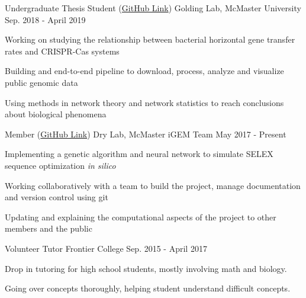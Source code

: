 \begin{cventries}
    \cventry
      {Undergraduate Thesis Student (\href{https://github.com/DJSiddharthVader/thesis_SidReed}{GitHub Link})}
      {Golding Lab, McMaster University}
      {Sep. 2018 - April 2019}
      {}
      {
        \begin{cvitems}
         \item {Working on studying the relationship between bacterial horizontal gene transfer rates and CRISPR-Cas systems}
         \item {Building and end-to-end pipeline to download, process, analyze and visualize public genomic data}
         \item {Using methods in network theory and network statistics to reach conclusions about biological phenomena}
        \end{cvitems}
      }
	\cventry
      {Member (\href{https://github.com/mgem/mgem-drylab-2017}{GitHub Link})}
      {Dry Lab, McMaster iGEM Team}
      {}
      {May 2017 - Present}
      {
        \begin{cvitems}
          \item{Implementing a genetic algorithm and neural network to simulate SELEX sequence optimization \textit{in silico}}
          \item{Working collaboratively with a team to build the project, manage documentation and version control using git}
          \item{Updating and explaining the computational aspects of the project to other members and the public}
        \end{cvitems}
      }
  \cventry
    {Volunteer Tutor} %
    {Frontier College}
    {} %
    {Sep. 2015 - April 2017} %
    {
      \begin{cvitems}
        \item{Drop in tutoring for high school students, mostly involving math and biology.}
        \item{Going over concepts thoroughly, helping student understand difficult concepts.}
      \end{cvitems}
    }
\end{cventries}
